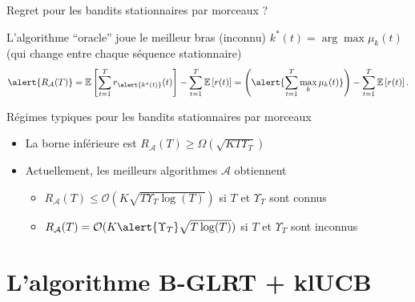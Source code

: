 \documentclass[11pt,french,ignorenonframetext,]{beamer}
\providecommand{\tightlist}{%
  \setlength{\itemsep}{0pt}\setlength{\parskip}{0pt}}
\begin{document}
\begin{frame}{Regret pour les bandits stationnaires par morceaux ?}

  L'algorithme ``oracle'' joue le meilleur bras (inconnu) $k^*(t) = \arg\max \mu_k(t)$
  (qui change entre chaque séquence stationnaire)
  \[ \alert{ R_{\mathcal{A}}(T) } = \mathbb{E}\left[ \sum\limits_{t=1}^T r_{\alert{k^*(t)}}(t) \right] - \sum\limits_{t=1}^T \mathbb{E}\left[ r(t) \right] = \left(\alert{\sum_{t=1}^T \max_k \mu_k(t)} \right) - \sum\limits_{t=1}^T \mathbb{E}\left[ r(t) \right]. \]

\pause
\vspace*{10pt}

\begin{exampleblock}{Régimes typiques pour les bandits stationnaires par morceaux}
  \begin{itemize}
  \item
  La borne inférieure est
  $R_{\mathcal{A}}(T) \geq \Omega(\sqrt{K T \Upsilon_T})$

  \item
  Actuellement, les meilleurs algorithmes $\mathcal{A}$  obtiennent
    \begin{itemize}\tightlist
      \item
      $R_{\mathcal{A}}(T) \leq \mathcal{O}(K \sqrt{T \Upsilon_T \log(T)})$
      si $T$ et $\Upsilon_T$ sont connus
      \item
      $R_{\mathcal{A}}(T) = \mathcal{O}(K \alert{\Upsilon_T} \sqrt{T \log(T)})$
      si $T$ et $\Upsilon_T$ sont inconnus
    \end{itemize}
  \end{itemize}
\end{exampleblock}

\end{frame}


\section{\hfill{}L'algorithme B-GLRT + klUCB\hfill{}}



\end{document}
